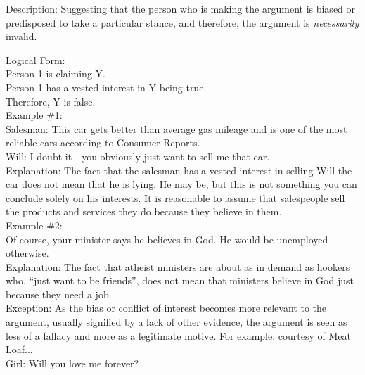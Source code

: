 \documentclass[a4paper,12pt,single,pdftex]{scrbook}
\begin{document}
  
    Description: Suggesting that the person who is making the argument is biased or predisposed to take a particular stance, and therefore, the argument is {\it necessarily} invalid.

    
      Logical Form:
    \\

    
      Person 1 is claiming Y.
    \\

    
      Person 1 has a vested interest in Y being true.
    \\

    
      Therefore, Y is false.
    \\

    
      Example \#1:
    \\

    
      Salesman: This car gets better than average gas mileage and is one of the most reliable cars according to Consumer Reports.
    \\

    
      Will: I doubt it—you obviously just want to sell me that car.
    \\

    
      Explanation: The fact that the salesman has a vested interest in selling Will the car does not mean that he is lying.  He may be, but this is not something you can conclude solely on his interests.  It is reasonable to assume that salespeople sell the products and services they do because they believe in them.
    \\

    
      Example \#2:
    \\

    
      Of course, your minister says he believes in God.  He would be unemployed otherwise.
    \\

    
      Explanation: The fact that atheist ministers are about as in demand as hookers who, “just want to be friends”, does not mean that ministers believe in God just because they need a job.
    \\

    
      Exception: As the bias or conflict of interest becomes more relevant to the argument, usually signified by a lack of other evidence, the argument is seen as less of a fallacy and more as a legitimate motive.  For example, courtesy of Meat Loaf...
    \\

    
      Girl: Will you love me forever?
    \\
\end{document}
